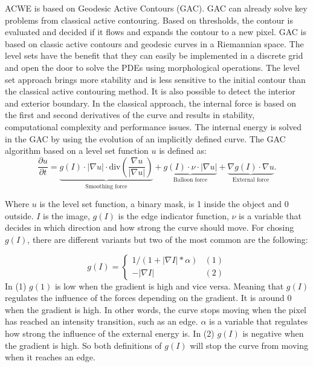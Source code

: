 ACWE is based on Geodesic Active Contours (GAC)\cite{}. GAC can already solve key problems from classical active contouring. Based on thresholds, the contour is evaluated and decided if it flows and expands the contour to a new pixel. GAC is based on classic active contours and geodesic curves in a Riemannian space. The level sets have the benefit that they can easily be implemented in a discrete grid and open the door to solve the PDEs using morphological operations. The level set approach brings more stability and is less sensitive to the initial contour than the classical active contouring method. It is also possible to detect the interior and exterior boundary. In the classical approach, the internal force is based on the first and second derivatives of the curve and results in stability, computational complexity and performance issues. The internal energy is solved in the GAC by using the evolution of an implicitly defined curve. The GAC algorithm based on a level set function $u$ is defined as:
\begin{equation}
    \frac{\partial u}{\partial t} = 
    \underbrace{g(I) \cdot |\nabla u| \cdot \text{div} \left(\frac{\nabla u}{|\nabla u|}\right)}_{\text{Smoothing force}} 
    + \underbrace{g(I) \cdot \nu \cdot |\nabla u|}_{\text{Balloon force}} 
    + \underbrace{\nabla g(I) \cdot \nabla u}_{\text{External force}}.
    \label{deform}
    \end{equation}
    
Where $u$ is the level set function, a binary mask, is 1 inside the object and 0 outside. $I$ is the image, $g(I)$ is the edge indicator function, $\nu$ is a variable that decides in which direction and how strong the curve should move. 
For chosing $g(I)$, there are different variants but two of the most common are the following: 

\begin{equation}
    g(I) = \begin{cases}
     1/(1 + |\nabla I|*\alpha) &(1)\\
     -|\nabla I| &(2)
    \end{cases}
\end{equation}
In (1) $g(1)$ is low when the gradient is high and vice versa. Meaning that $g(I)$ regulates the influence of the forces depending on the gradient. It is around 0 when the gradient is high. In other words, the curve stops moving when the pixel has reached an intensity transition, such as an edge. $\alpha$ is a variable that regulates how strong the influence of the external energy is. In (2) $g(I)$ is negative when the gradient is high. So both definitions of $g(I)$ will stop the curve from moving when it reaches an edge.

